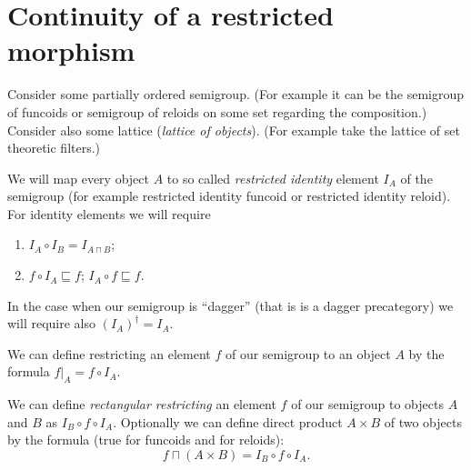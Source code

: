\section{Continuity of a restricted
morphism}

Consider some partially ordered semigroup. (For example it can be
the semigroup of funcoids or semigroup of reloids on some set regarding
the composition.) Consider also some lattice (\emph{lattice of objects}).
(For example take the lattice of set theoretic filters.)

We will map every object $A$ to so called \emph{restricted identity}
element $I_{A}$ of the semigroup (for example restricted identity
funcoid or restricted identity reloid). For identity elements we will
require
\begin{enumerate}
\item $I_{A}\circ I_{B}=I_{A\sqcap B}$;
\item $f\circ I_{A}\sqsubseteq f$; $I_{A}\circ f\sqsubseteq f$.
\end{enumerate}
In the case when our semigroup is ``dagger'' (that is is a dagger
precategory) we will require also $(I_{A})^{\dagger}=I_{A}$.

We can define restricting an element $f$ of our semigroup to an object
$A$ by the formula $f|_{A}=f\circ I_{A}$.

We can define \emph{rectangular restricting}
an element $f$ of our semigroup to objects $A$ and $B$ as $I_{B}\circ f\circ I_{A}$.
Optionally we can define direct product $A\times B$ of two objects
by the formula (true for funcoids and for reloids):
\[
f\sqcap(A\times B)=I_{B}\circ f\circ I_{A}.
\]



